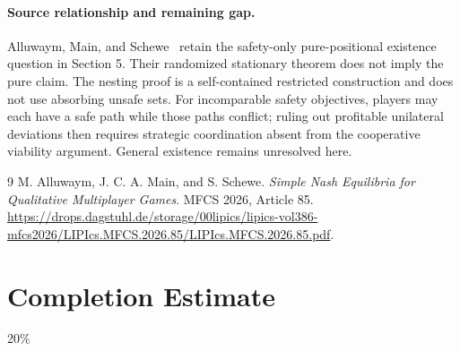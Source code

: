 \documentclass[11pt]{article}
\theoremstyle{definition}
\theoremstyle{remark}
\begin{document}
\paragraph{Source relationship and remaining gap.}
Alluwaym, Main, and Schewe~\cite{source} retain the safety-only pure-positional existence question in Section 5. Their randomized stationary theorem does not imply the pure claim. The nesting proof is a self-contained restricted construction and does not use absorbing unsafe sets. For incomparable safety objectives, players may each have a safe path while those paths conflict; ruling out profitable unilateral deviations then requires strategic coordination absent from the cooperative viability argument. General existence remains unresolved here.

\begin{thebibliography}{9}
 M. Alluwaym, J. C. A. Main, and S. Schewe.
\emph{Simple Nash Equilibria for Qualitative Multiplayer Games}. MFCS 2026, Article 85.
\url{https://drops.dagstuhl.de/storage/00lipics/lipics-vol386-mfcs2026/LIPIcs.MFCS.2026.85/LIPIcs.MFCS.2026.85.pdf}.
\end{thebibliography}

\section{Completion Estimate}
20\%
\end{document}
